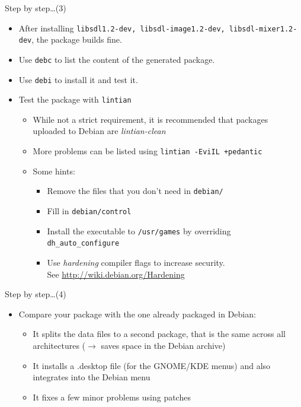 \documentclass[10pt,final]{beamer}
\begin{document}
\begin{frame}{Step by step\ldots (3)}
\begin{itemize}
	\item After installing \texttt{libsdl1.2-dev, libsdl-image1.2-dev, libsdl-mixer1.2-dev}, the package builds fine.
		\hbr
	\item Use \texttt{debc} to list the content of the generated package.
		\hbr
	\item Use \texttt{debi} to install it and test it.
		\hbr
	\item Test the package with \texttt{lintian}
		\begin{itemize}
			\item While not a strict requirement, it is recommended that packages uploaded to Debian are \textsl{lintian-clean}
		\hbr
			\item More problems can be listed using \texttt{lintian -EviIL +pedantic}
		\hbr
			\item Some hints:
				\begin{itemize}
					\item Remove the files that you don't need in \texttt{debian/}
		\hbr
					\item Fill in \texttt{debian/control}
						\hbr
					\item Install the executable to \texttt{/usr/games} by overriding \texttt{dh\_auto\_configure}
		\hbr
					\item Use \textsl{hardening} compiler flags to increase security.\\ See \url{http://wiki.debian.org/Hardening}
				\end{itemize}
		\end{itemize}
\end{itemize}
\end{frame}

\begin{frame}{Step by step\ldots (4)}
		\begin{itemize}
	\item Compare your package with the one already packaged in Debian:
		\begin{itemize}
			\item It splits the data files to a second package, that is the same across all architectures ($\rightarrow$ saves space in the Debian archive)
				\hbr
			\item It installs a .desktop file (for the GNOME/KDE menus) and also integrates into the Debian menu
				\hbr
			\item It fixes a few minor problems using patches
		\end{itemize}
\end{itemize}
\end{frame}
\end{document}
